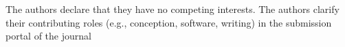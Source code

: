 The authors declare that they have no competing interests.
The authors clarify their contributing roles (e.g., conception, software, writing) in the submission portal of the journal
